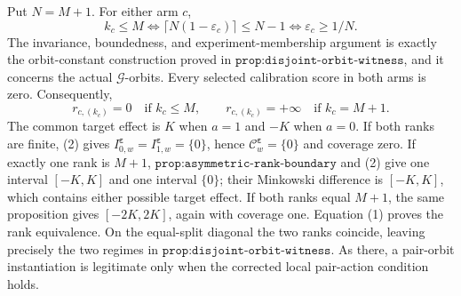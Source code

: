 Put \(N=M+1\). For either arm \(c\), \[k_c\le M\Longleftrightarrow \lceil N(1-\varepsilon_c)\rceil\le N-1\Longleftrightarrow \varepsilon_c\ge 1/N.\tag{1}\] The invariance, boundedness, and experiment-membership argument is exactly the orbit-constant construction proved in \(\texttt{prop:disjoint-orbit-witness}\), and it concerns the actual \(\mathcal G\)-orbits. Every selected calibration score in both arms is zero. Consequently, \[r_{c,(k_c)}=0\quad\text{if }k_c\le M,\qquad r_{c,(k_c)}=+\infty\quad\text{if }k_c=M+1.\tag{2}\] The common target effect is \(K\) when \(a=1\) and \(-K\) when \(a=0\). If both ranks are finite, (2) gives \(I^{\boldsymbol\varepsilon}_{0,w}=I^{\boldsymbol\varepsilon}_{1,w}=\{0\}\), hence \(\mathcal C^{\boldsymbol\varepsilon}_w=\{0\}\) and coverage zero. If exactly one rank is \(M+1\), \(\texttt{prop:asymmetric-rank-boundary}\) and (2) give one interval \([-K,K]\) and one interval \(\{0\}\); their Minkowski difference is \([-K,K]\), which contains either possible target effect. If both ranks equal \(M+1\), the same proposition gives \([-2K,2K]\), again with coverage one. Equation (1) proves the rank equivalence. On the equal-split diagonal the two ranks coincide, leaving precisely the two regimes in \(\texttt{prop:disjoint-orbit-witness}\). As there, a pair-orbit instantiation is legitimate only when the corrected local pair-action condition holds.